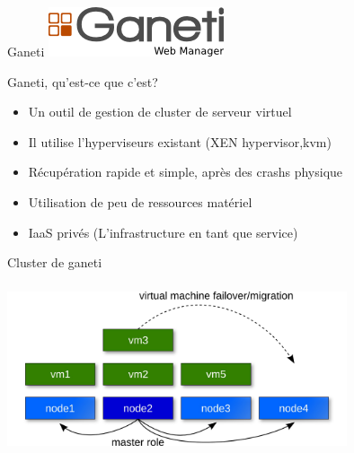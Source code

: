 

%

\begin{frame}
  \begin{center}
   \huge{Ganeti}
   \includegraphics{images_presentation/api.png}
  \end{center}
\end{frame}

\begin{frame}{Ganeti, qu'est-ce que c'est?}
\begin{itemize}
\item Un outil de gestion de cluster de serveur virtuel
\pause
\item Il utilise l'hyperviseurs existant (XEN hypervisor,kvm)
\pause
\item Récupération rapide et simple, après des crashs physique
\pause
\item Utilisation de peu de ressources matériel
\pause
\item IaaS privés (L'infrastructure en tant que service)
\end{itemize}
\end{frame}

\begin{frame}{Cluster de ganeti}
\begin{center}
 \includegraphics[width=10cm,height=5cm]{images_presentation/ganeti_cluster.png}
\end{center}
\end{frame}


